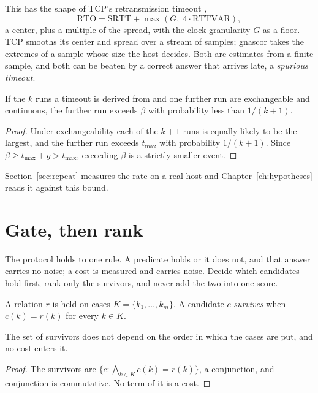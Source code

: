 This has the shape of TCP's retransmission timeout \cite{src:RFC6298},
\[
  \mathrm{RTO} = \mathrm{SRTT} + \max(G,\; 4 \cdot \mathrm{RTTVAR}),
\]
a center, plus a multiple of the spread, with the clock granularity \(G\) as a floor. TCP smooths
its center and spread over a stream of samples; gnascor takes the extremes of a sample whose size
the host decides. Both are estimates from a finite sample, and both can be beaten by a correct
answer that arrives late, a \emph{spurious timeout}.

\begin{proposition}
\label{prop:spurious}
If the \(k\) runs a timeout is derived from and one further run are exchangeable and continuous,
the further run exceeds \(\beta\) with probability less than \(1/(k+1)\).
\end{proposition}

\begin{proof}
Under exchangeability each of the \(k+1\) runs is equally likely to be the largest, and the
further run exceeds \(t_{\max}\) with probability \(1/(k+1)\). Since
\(\beta \ge t_{\max} + g > t_{\max}\), exceeding \(\beta\) is a strictly smaller event.
\end{proof}

Section~\ref{sec:repeat} measures the rate on a real host and Chapter~\ref{ch:hypotheses} reads
it against this bound.

\section{Gate, then rank}

The protocol holds to one rule. A predicate holds or it does not, and that answer carries no
noise; a cost is measured and carries noise. Decide which candidates hold first, rank only the
survivors, and never add the two into one score.

\begin{definition}[Gate]
A relation \(r\) is held on cases \(K = \{k_1, \ldots, k_m\}\). A candidate \(c\) \emph{survives}
when \(c(k) = r(k)\) for every \(k \in K\).
\end{definition}

\begin{proposition}
\label{prop:gate}
The set of survivors does not depend on the order in which the cases are put, and no cost enters
it.
\end{proposition}

\begin{proof}
The survivors are \(\{c : \bigwedge_{k \in K} c(k) = r(k)\}\), a conjunction, and conjunction is
commutative. No term of it is a cost.
\end{proof}

